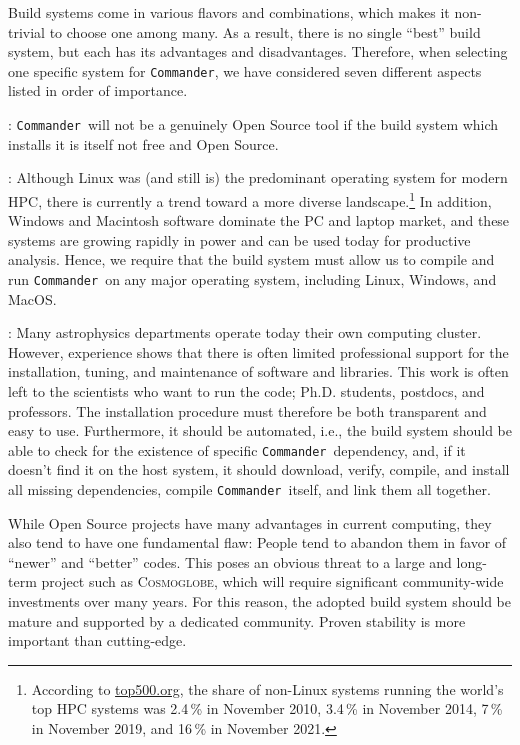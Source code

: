 \documentclass[twocolumn]{openjournal}
\def\commander{\texttt{Commander}}
\newcommand{\cosmoglobe}{\textsc{Cosmoglobe}}
\begin{document}
Build systems come in various flavors and combinations, which makes it
non-trivial to choose one among many. As a result, there is no single ``best''
build system, but each has its advantages and disadvantages. Therefore, when
selecting one specific system for \commander, we have considered seven
different aspects listed in order of importance.

: \commander\ will not be a genuinely Open
Source tool if the build system which installs it is itself not free and Open
Source.

: Although Linux was (and still is) the predominant
operating system for modern HPC, there is currently a trend toward a more
diverse landscape.\footnote{According to
\href{https://www.top500.org/statistics/list/}{top500.org}, the share of
non-Linux systems running the world's top HPC systems was 2.4\,\% in November
2010, 3.4\,\% in November 2014, 7\,\% in November 2019, and 16\,\% in November
2021.} In addition, Windows and Macintosh software dominate the PC and laptop
market, and these systems are growing rapidly in power and can be used today
for productive analysis. Hence, we require that the build system must allow us
to compile and run \commander\ on any major operating system, including Linux,
Windows, and MacOS.

: Many astrophysics departments operate today their own
computing cluster. However, experience shows that there is often limited
professional support for the installation, tuning, and maintenance of software
and libraries. This work is often left to the scientists who want to run the
code; Ph.D. students, postdocs, and professors. The installation procedure must
therefore be both transparent and easy to use. Furthermore, it should be
automated, i.e., the build system should be able to check for the existence of
specific \commander\ dependency, and, if it doesn't find it on the host system,
it should download, verify, compile, and install all missing dependencies,
compile \commander\ itself, and link them all together.

 While Open Source projects have many
advantages in current computing, they also tend to have one fundamental flaw:
People tend to abandon them in favor of ``newer'' and ``better'' codes. This
poses an obvious threat to a large and long-term project such as \cosmoglobe,
which will require significant community-wide investments over many years. For
this reason, the adopted build system should be mature and supported by a
dedicated community. Proven stability is more important than cutting-edge.
\end{document}
